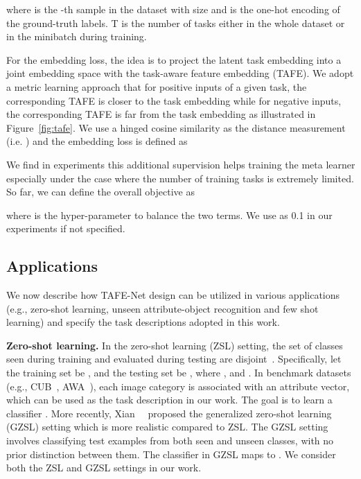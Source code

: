 \documentclass[10pt,twocolumn,letterpaper]{article}
\newcommand{\model}{TAFE-Net\xspace}
\newcommand\minisection[1]{\vspace{2mm}\noindent \textbf{#1}}
\begin{document}
where  is the -th sample in the dataset with size  and  is the one-hot encoding of the ground-truth labels. T is the number of tasks either in the whole dataset or in the minibatch during 
training. 

For the embedding loss, the idea is to project the latent task embedding  into a
joint embedding space with the task-aware feature embedding (TAFE). We adopt a metric learning approach that for positive inputs of a
given task, the corresponding TAFE is 
closer to the task embedding  while for negative inputs, the corresponding TAFE is
far from the task embedding as illustrated in Figure~\ref{fig:tafe}. We use a hinged cosine similarity as the distance measurement  
(i.e. )  and  the embedding loss is defined as 

We find in experiments this additional supervision helps training the meta learner especially under the case where the number of training tasks is extremely limited. So far, we can define the overall objective as 

where  is the hyper-parameter to balance the two terms. We use 
as 0.1 in our experiments if not specified. 
























 	\subsection{Applications}
\label{sec:app}
We now describe how \model design can be utilized in various applications (e.g., zero-shot learning, 
unseen attribute-object recognition and few shot learning) and specify the task descriptions adopted in this 
work. 

\minisection{Zero-shot learning.} In the zero-shot learning (ZSL) setting, the set of classes seen during 
training and evaluated during testing are disjoint~\cite{lampert2014attribute,akata2016label}. Specifically,
let the training set be , and 
the testing set be , where ,  and .  In benchmark datasets (e.g., CUB~\cite{WelinderEtal2010}, AWA~\cite{lampert2009learning}), each image category 
is associated with an attribute vector, which can be used as the task description in our work.
The goal is to learn a classifier . More recently,
Xian~\etal~\cite{xian2018zero} proposed the generalized zero-shot learning (GZSL) setting which is more realistic compared to ZSL. The GZSL setting involves classifying test examples from
both seen and unseen classes, with no prior distinction between them. The classifier in GZSL maps 
to . We consider both the ZSL and GZSL settings in our work. 
\end{document}
